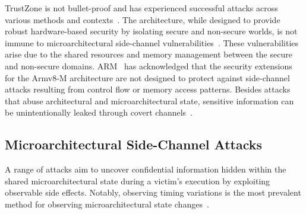 TrustZone is not bullet-proof and has experienced successful attacks across
various methods and contexts~\cite{DemystifyingAT, surveyonTEE,
returntononsecure}. The architecture, while designed to provide robust
hardware-based security by isolating secure and non-secure worlds, is not
immune to microarchitectural side-channel
vulnerabilities~\cite{DemystifyingAT, busted, surveyonTEE, truspy,
Bypassed}. These vulnerabilities arise due to the shared resources and
memory management between the secure and non-secure domains.
ARM~\cite{armdeveloper} has acknowledged that the security extensions for
the Armv8-M architecture are not designed to protect against side-channel
attacks resulting from control flow or memory access patterns.
Besides attacks that abuse architectural and microarchitectural state,
sensitive information can be unintentionally leaked through covert
channels~\cite{storagechannel, sabelfeld}.

\subsection{Microarchitectural Side-Channel Attacks}

A range of attacks aim to uncover confidential information hidden within
the shared microarchitectural state during a victim's execution by
exploiting observable side effects. Notably, observing timing variations
is the most prevalent method for observing microarchitectural state
changes~\cite{vanbulckphdthesis}.

